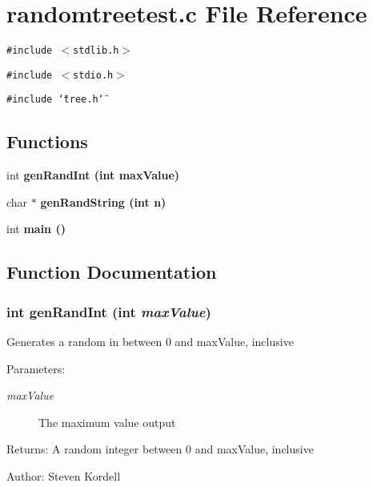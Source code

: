 \section{randomtreetest.c File Reference}
\label{randomtreetest_8c}
{\tt \#include $<$stdlib.h$>$}\par
{\tt \#include $<$stdio.h$>$}\par
{\tt \#include \char`\"{}tree.h\char`\"{}}\par
\subsection*{Functions}
\begin{CompactItemize}
\item 
int \bf{gen\-Rand\-Int} (int max\-Value)
\item 
char $\ast$ \bf{gen\-Rand\-String} (int n)
\item 
int \bf{main} ()
\end{CompactItemize}


\subsection{Function Documentation}
\subsubsection{\setlength{\rightskip}{0pt plus 5cm}int gen\-Rand\-Int (int {\em max\-Value})}\label{randomtreetest_8c_c4418fa1a8e694adecb1016209595ae1}


Generates a random in between 0 and max\-Value, inclusive \begin{Desc}
\item[Parameters:]
\begin{description}
\item[{\em max\-Value}]The maximum value output \end{description}
\end{Desc}
\begin{Desc}
\item[Returns:]A random integer between 0 and max\-Value, inclusive \end{Desc}
\begin{Desc}
\item[Author:]Steven Kordell \end{Desc}
